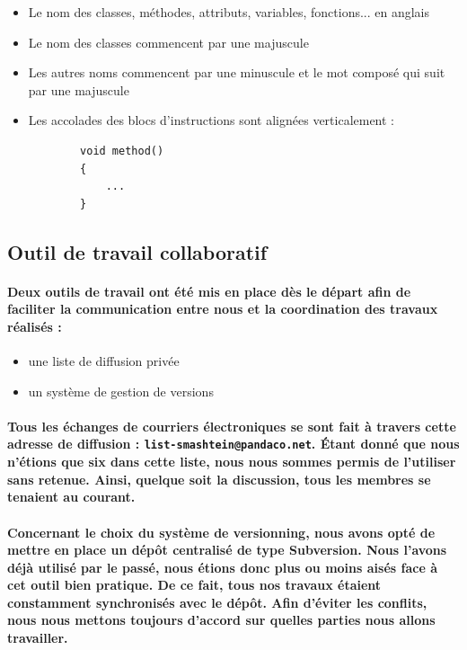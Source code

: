 \begin{itemize}
	\item Le nom des classes, méthodes, attributs, variables, fonctions... en anglais 
	\item Le nom des classes commencent par une majuscule
	\item Les autres noms commencent par une minuscule et le mot composé qui suit par une majuscule
	\item Les accolades des blocs d'instructions sont alignées verticalement :
	\begin{verbatim}
		void method()
		{
		    ...		
		}
	\end{verbatim}
\end{itemize}


\vspace{1cm}
\subsection{Outil de travail collaboratif}
\vspace{0.5cm}

\paragraph{Deux outils de travail ont été mis en place dès le départ afin de faciliter la communication entre nous et la coordination des travaux réalisés :}

\begin{itemize}
	\item une liste de diffusion privée
	\item un système de gestion de versions
\end{itemize}

\vspace{0.5cm}

\paragraph{Tous les échanges de courriers électroniques se sont fait à travers cette adresse de diffusion : \verb?list-smashtein@pandaco.net?. \'Etant donné que nous n'étions que six dans cette liste, nous nous sommes permis de l'utiliser sans retenue. Ainsi, quelque soit la discussion, tous les membres se tenaient au courant.}

\paragraph{Concernant le choix du système de versionning, nous avons opté de mettre en place un dép\^ot centralisé de type Subversion. Nous l'avons déjà utilisé par le passé, nous étions donc plus ou moins aisés face à cet outil bien pratique. De ce fait, tous nos travaux étaient constamment synchronisés avec le dép\^ot. Afin d'éviter les conflits, nous nous mettons toujours d'accord sur quelles parties nous allons travailler.}

